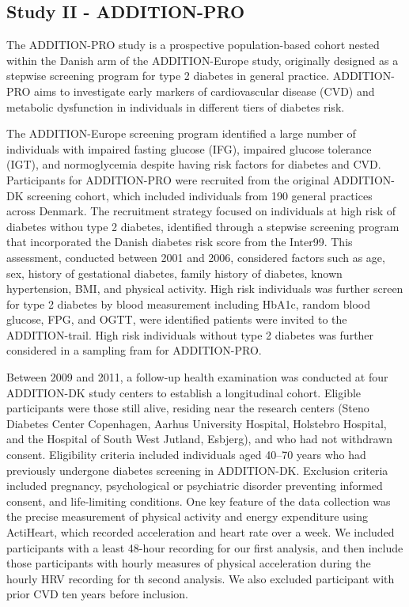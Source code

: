 \documentclass[
  a4paper,
  headsepline=true,
  open=any]{scrbook}
\begin{document}
\hypertarget{study-ii---addition-pro}{%
\subsection{Study II - ADDITION-PRO}\label{study-ii---addition-pro}}

The ADDITION-PRO study is a prospective population-based cohort nested
within the Danish arm of the ADDITION-Europe study, originally designed
as a stepwise screening program for type 2 diabetes in general practice.
ADDITION-PRO aims to investigate early markers of cardiovascular disease
(CVD) and metabolic dysfunction in individuals in different tiers of
diabetes risk.

The ADDITION-Europe screening program identified a large number of
individuals with impaired fasting glucose (IFG), impaired glucose
tolerance (IGT), and normoglycemia despite having risk factors for
diabetes and CVD. Participants for ADDITION-PRO were recruited from the
original ADDITION-DK screening cohort, which included individuals from
190 general practices across Denmark. The recruitment strategy focused
on individuals at high risk of diabetes withou type 2 diabetes,
identified through a stepwise screening program that incorporated the
Danish diabetes risk score from the Inter99. This assessment, conducted
between 2001 and 2006, considered factors such as age, sex, history of
gestational diabetes, family history of diabetes, known hypertension,
BMI, and physical activity. High risk individuals was further screen for
type 2 diabetes by blood measurement including HbA1c, random blood
glucose, FPG, and OGTT, were identified patients were invited to the
ADDITION-trail. High risk individuals without type 2 diabetes was
further considered in a sampling fram for ADDITION-PRO.

Between 2009 and 2011, a follow-up health examination was conducted at
four ADDITION-DK study centers to establish a longitudinal cohort.
Eligible participants were those still alive, residing near the research
centers (Steno Diabetes Center Copenhagen, Aarhus University Hospital,
Holstebro Hospital, and the Hospital of South West Jutland, Esbjerg),
and who had not withdrawn consent. Eligibility criteria included
individuals aged 40--70 years who had previously undergone diabetes
screening in ADDITION-DK. Exclusion criteria included pregnancy,
psychological or psychiatric disorder preventing informed consent, and
life-limiting conditions. One key feature of the data collection was the
precise measurement of physical activity and energy expenditure using
ActiHeart, which recorded acceleration and heart rate over a week. We
included participants with a least 48-hour recording for our first
analysis, and then include those participants with hourly measures of
physical acceleration during the hourly HRV recording for th second
analysis. We also excluded participant with prior CVD ten years before
inclusion.
\end{document}
